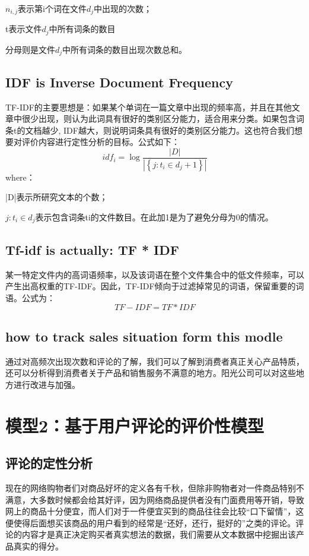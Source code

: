 \documentclass[UTF8]{article}
\newcommand{\upcite}[1]{\textsuperscript{\textsuperscript{\cite{#1}}}}
\begin{document}
$n_{i,j}$表示第i个词在文件$d_j$中出现的次数；

t表示文件$d_j$中所有词条的数目

分母则是文件$d_j$中所有词条的数目出现次数总和。

\subsection{ IDF is Inverse Document Frequency}
 TF-IDF的主要思想是：如果某个单词在一篇文章中出现的频率高，并且在其他文章中很少出现，则认为此词具有很好的类别区分能力，适合用来分类。如果包含词条t的文档越少, IDF越大，则说明词条具有很好的类别区分能力\upcite{Baenagarc2012TF}。这也符合我们想要对评价内容进行定性分析的目标。公式如下：
 \begin{equation}
 i d f_{i}=\log \frac{|D|}{\left|\left\{j: t_{i} \in d_{j}+1\right\}\right|}
 \end{equation}
 where：
 
 |D|表示所研究文本的个数；
 
 $j: t_{i} \in d_{j}$表示包含词条ti的文件数目。在此加1是为了避免分母为0的情况。
 
\subsection{Tf-idf is actually: TF * IDF}
某一特定文件内的高词语频率，以及该词语在整个文件集合中的低文件频率，可以产生出高权重的TF-IDF。因此，TF-IDF倾向于过滤掉常见的词语，保留重要的词语。公式为：
\begin{equation}
TF-I D F=T F * I D F
\end{equation}

\subsection{how to track sales situation form this modle}
通过对高频次出现次数和评论的了解，我们可以了解到消费者真正关心产品特质，还可以分析得到消费者关于产品和销售服务不满意的地方。阳光公司可以对这些地方进行改进与加强。

\section{模型2：基于用户评论的评价性模型}
\subsection{评论的定性分析}
现在的网络购物者们对商品好坏的定义各有千秋，但除非购物者对一件商品特别不满意，大多数时候都会给其好评，因为网络商品提供者没有门面费用等开销，导致网上的商品十分便宜，而人们对于一件便宜买到的商品往往会比较“口下留情”，这便使得后面想买该商品的用户看到的经常是“还好，还行，挺好的”之类的评论\upcite{zz}。评论的内容才是真正决定购买者真实想法的数据，我们需要从文本数据中挖掘出该产品真实的得分。
\end{document}
